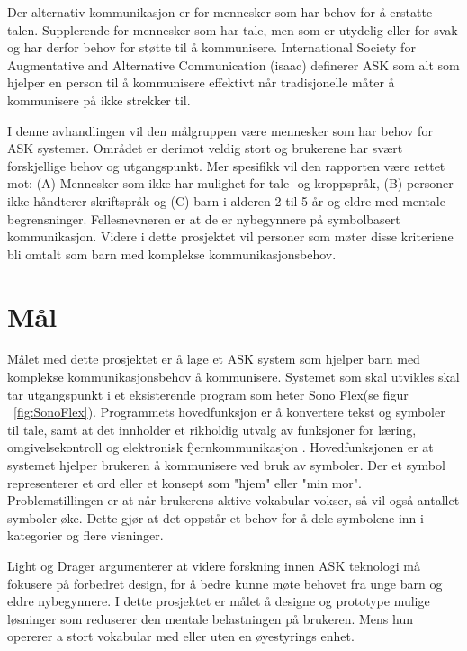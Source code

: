 \documentclass[phd,tocprelim]{cornell}
\begin{document}
Der alternativ kommunikasjon er for mennesker som har behov for å erstatte talen. Supplerende for mennesker som har tale, men som er utydelig eller for svak og har derfor behov for støtte til å kommunisere.  International Society for Augmentative and Alternative Communication (\gls{isaac}) \cite{HvaErASK} definerer ASK som alt som hjelper en person til å kommunisere effektivt når tradisjonelle måter å kommunisere på ikke strekker til.  

I denne avhandlingen vil den  målgruppen være mennesker som har behov for  ASK systemer. Området er derimot veldig stort og brukerene har svært forskjellige behov og utgangspunkt. Mer spesifikk vil den rapporten være rettet mot: (A) Mennesker som ikke har mulighet for tale- og kroppspråk,  (B) personer ikke håndterer skriftspråk og (C) barn i alderen 2 til 5 år og eldre med mentale begrensninger. Fellesnevneren er at de er nybegynnere på symbolbasert kommunikasjon. Videre i dette prosjektet vil personer som møter disse kriteriene bli omtalt som barn med komplekse kommunikasjonsbehov. 

\section{Mål}
\label{sec:goal}

Målet med dette prosjektet er å lage et ASK system som hjelper barn med komplekse kommunikasjonsbehov å kommunisere. Systemet som skal utvikles skal tar utgangspunkt i et eksisterende program som heter Sono Flex(se figur ~\ref{fig:SonoFlex}). Programmets hovedfunksjon er å konvertere tekst og symboler til tale, samt at det innholder et rikholdig utvalg av funksjoner for læring, omgivelsekontroll og elektronisk fjernkommunikasjon \cite{TobiiCommunicator}. Hovedfunksjonen er at systemet hjelper brukeren å kommunisere ved bruk av symboler. Der et symbol representerer et ord eller et konsept som "hjem" eller "min mor". Problemstillingen er at når brukerens aktive vokabular vokser, så vil også antallet symboler øke. Dette gjør at det oppstår et behov for å dele symbolene inn i kategorier og flere visninger.

Light og Drager \cite{aac} argumenterer at videre forskning innen ASK teknologi må fokusere på forbedret design, for å bedre kunne møte behovet fra unge barn og eldre nybegynnere. I dette prosjektet er målet å designe og prototype mulige løsninger som reduserer den mentale belastningen på brukeren. Mens hun opererer a stort vokabular med eller uten en øyestyrings enhet.
\end{document}
